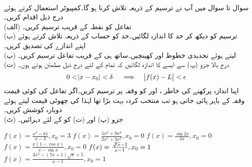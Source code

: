 \\
سوال  تا سوال  میں آپ نے ترسیم کے ذریعہ  تلاش کرنا ہو گا۔کمپیوٹر استعمال کرتے ہوئے درج ذیل اقدام کریں۔\\
(الف) \quad
تفاعل  کو نقطہ  کے قریب ترسیم کریں۔\\
(ب) \quad
ترسیم کو دیکھ کر حد کا اندازہ لگائیں۔حد کو حساب کے ذریعہ تلاش کرتے ہوئے اپنے اندازے کی تصدیق کریں۔\\
(پ)\quad
{} لیتے ہوئے تحدیدی خطوط  اور  کھینچیں۔ساتھ ہی  کے قریب تفاعل  ترسیم  کریں۔\\
(ت) \quad
درج بالا جزو (پ) سے ایسے  کا اندازہ لگائیں کہ تمام  کے لئے درج ذیل مطمئن ہوتے ہوں۔
\begin{align*}
0<\abs{x-x_0}<\delta\quad \implies \quad \abs{f(x)-L}<\epsilon
\end{align*}
اپنا اندازہ پرکھنے کی خاطر ،  اور  کو وقفہ  پر ترسیم کریں۔اگر تفاعل کی کوئی قیمت وقفہ  کے باہر پائی جاتی ہو تب منتخب کردہ بہت بڑا تھا لہٰذا  کی چھوٹی قیمت لیتے ہوئے دوبارہ کوشش کریں۔ \\
(ٹ)\quad
جزو (پ) اور (ت) کو  کے لئے دہرائیں۔

$f(x)=\tfrac{x^4-81}{x-3}, x_0=3$
$f(x)=\tfrac{5x^3+9x^2}{2x^5+3x^2}, x_0=0$
$f(x)=\tfrac{\sin 2x}{3x}, x_0=0$
$f(x)=\tfrac{x(1-\cos x)}{x-\sin x}, x_0=0$
$f(x)=\tfrac{\sqrt[\leftroot{-2}3]{x}-1}{x-1}, x_0=1$
$f(x)=\tfrac{3x^2-(7x+1)\sqrt{x}+5}{x-1}, x_0=1$


